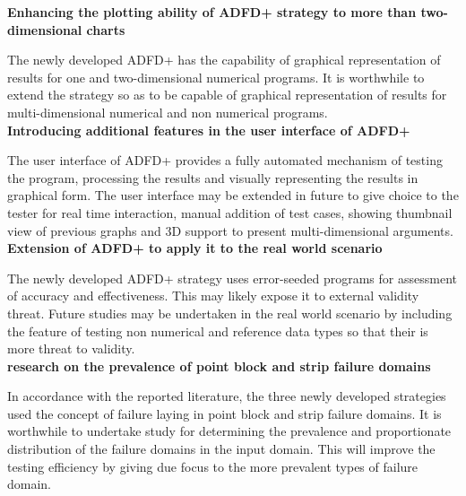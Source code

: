 
\textbf{Enhancing the plotting ability of ADFD+ strategy to more than two-dimensional charts}

The newly developed ADFD+ has the capability of graphical representation of results for one and two-dimensional numerical programs. It is worthwhile to extend the strategy so as to be capable of graphical representation of results for multi-dimensional numerical and non numerical programs. \\

\textbf{Introducing additional features in the user interface of ADFD+}

The user interface of ADFD+ provides a fully automated mechanism of testing the program, processing the results and visually representing the results in graphical form. The user interface may be extended in future to give choice to the tester for real time interaction, manual addition of test cases, showing thumbnail view of previous graphs and 3D support to present multi-dimensional arguments.\\

\textbf{Extension of ADFD+ to apply it to the real world scenario}

The newly developed ADFD+ strategy uses error-seeded programs for assessment of accuracy and effectiveness. This may likely expose it to external validity threat.  Future studies may be undertaken in the real world scenario by including the feature of testing non numerical and reference data types so that their is more threat to validity.  \\

\textbf{research on the prevalence of point block and strip failure domains}

In accordance with the reported literature, the three newly developed strategies used the concept of failure laying in point block and strip failure domains. It is worthwhile to undertake study for determining the prevalence and proportionate distribution of the failure domains in the input domain. This will improve the testing efficiency by giving due focus to the more prevalent types of failure domain.  


	




